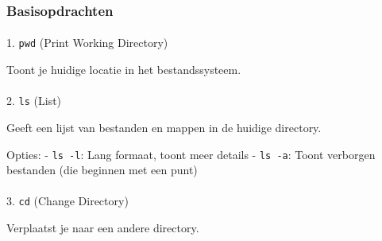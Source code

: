 \documentclass[
  letterpaper,
  DIV=11,
  numbers=noendperiod]{scrartcl}
\makeatletter
\let\oldparagraph\paragraph
\renewcommand{\paragraph}{
    \@ifstar
      \xxxParagraphStar
      \xxxParagraphNoStar
  }
\newcommand{\xxxParagraphStar}[1]{\oldparagraph*{#1}\mbox{}}
\newcommand{\xxxParagraphNoStar}[1]{\oldparagraph{#1}\mbox{}}
\newenvironment{Shaded}{\begin{snugshade}}{\end{snugshade}}
\newcommand{\ExtensionTok}[1]{\textcolor[rgb]{0.00,0.23,0.31}{#1}}
\newcommand{\NormalTok}[1]{\textcolor[rgb]{0.00,0.23,0.31}{#1}}
\makeatother
\begin{document}
\subsubsection{Basisopdrachten}\label{basisopdrachten}

\paragraph{\texorpdfstring{1. \texttt{pwd} (Print Working
Directory)}{1. pwd (Print Working Directory)}}\label{pwd-print-working-directory}

Toont je huidige locatie in het bestandssysteem.

\begin{Shaded}
\end{Shaded}

\paragraph{\texorpdfstring{2. \texttt{ls}
(List)}{2. ls (List)}}\label{ls-list}

Geeft een lijst van bestanden en mappen in de huidige directory.

\begin{Shaded}
\end{Shaded}

Opties: - \texttt{ls\ -l}: Lang formaat, toont meer details -
\texttt{ls\ -a}: Toont verborgen bestanden (die beginnen met een punt)

\paragraph{\texorpdfstring{3. \texttt{cd} (Change
Directory)}{3. cd (Change Directory)}}\label{cd-change-directory}

Verplaatst je naar een andere directory.

\begin{Shaded}
\end{Shaded}
\end{document}
